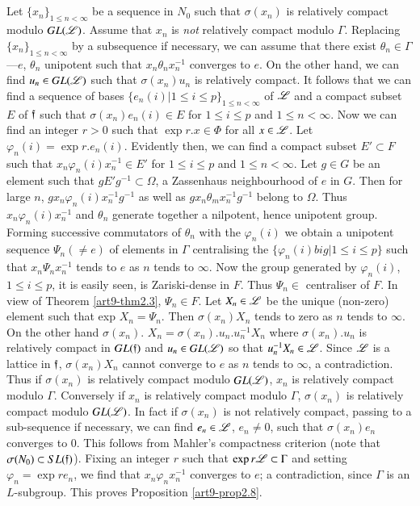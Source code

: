 \subsection{}\label{art9-subsec2.9}
Let $\{x_n\}_{1 \leqslant n < \infty}$ be a sequence in $N_0$ such that $\sigma (x_n)$ is relatively compact modulo $GL(\mathscr{L})$. Assume that $x_n$ is \textit{not} relatively compact modulo $\Gamma$. Replacing  $\{x_n\}_{1\leq n < \infty}$ by a subsequence if necessary, we can assume that there exist $\theta_n \in \Gamma$---$e$, $\theta_n$  unipotent such that $x_n \theta_n x^{-1}_n$ converges to $e$. On the other hand, we can find $u_n \in GL(\mathscr{L})$ such that $\sigma (x_n) u_n$ is relatively compact. It follows that we can find a sequence of bases $\{e_n (i) \big| 1 \leqslant i \leqslant p\}_{1 \leqslant n < \infty}$ of $\mathscr{L}$ and a compact subset $E$ of $\mathfrak{f}$ such that $\sigma (x_n) e_n (i) \in E$ for $1 \leqslant i \leqslant p$ and $1 \leqslant n < \infty$. Now we can find an integer $r >0$ such that $\exp r. x \in \Phi$ for all $x \in \mathscr{L}$. Let $\varphi_n (i) = \exp r. e_n (i)$. Evidently then, we can find a compact subset $E'\subset F$ such that $x_n \varphi_n (i) x^{-1}_n \in E'$ for $1 \leqslant i \leqslant p$ and $1 \leqslant n < \infty$. Let $g \in G$ be an element such that $g E' g^{-1} \subset \Omega$, a Zassenhaus neighbourhood of $e$ in $G$. Then for large $n$, $gx_n \varphi_n (i) x^{-1}_n g^{-1}$  as well as $gx_n \theta_m x^{-1}_n g^{-1}$ belong to $\Omega$. Thus $x_n \varphi_n (i)x^{-1}_n$ and $\theta_n$ generate together a nilpotent, hence unipotent group. Forming successive commutators of $\theta_n$ with the $\varphi_n (i)$ we obtain a unipotent sequence $\Psi_n (\neq e)$ of elements in $\Gamma$ centralising the $\{\varphi_n (i) big| 1 \leqslant i \leqslant p\}$ such that $x_n \Psi_n x^{-1}_n$ tends to $e$ as $n$ tends to $\infty$. Now the group generated by $\varphi_n (i)$, $1 \leqslant i \leqslant p$, it is easily seen, is Zariski-dense in $F$. Thus $\Psi_n \in $ centraliser of $F$. In view of Theorem \ref{art9-thm2.3}, $\Psi_n \in F$. Let $X_n \in \mathscr{L}$ be the unique (non-zero) element such that exp $X_n = \Psi_n$. Then $\sigma (x_n) X_n$ tends to zero as $n$ tends to $\infty$. On the other hand $\sigma(x_n)$. $X_n = \sigma (x_n). u_n. u^{-1}_n X_n$ where $\sigma (x_n). u_n$ is relatively compact in $GL(\mathfrak{f})$ and $u_n \in G L (\mathscr{L})$ so that $u^{-1}_n X_n \in \mathscr{L}$. Since $\mathscr{L}$ is a lattice in $\mathfrak{f}$, $\sigma (x_n) X_n$ cannot converge to $e$ as $n$ tends to $\infty$, a contradiction. Thus if $\sigma (x_n)$ is relatively compact modulo $GL(\mathscr{L})$, $x_n$ is relatively compact modulo $\Gamma$. Conversely if $x_n$ is relatively compact modulo $\Gamma$, $\sigma (x_n)$ is relatively compact modulo $GL(\mathscr{L})$. In fact if $\sigma (x_n)$ is not relatively compact, passing to a sub-sequence if necessary, we can find $e_n \in \mathscr{L}$, $e_n \neq 0$, such that $\sigma (x_n) e_n$ converges to 0. This follows from Mahler's compactness criterion (note that $\sigma (N_0) \subset SL(\mathfrak{f})$). Fixing an integer $r$ such that $\exp r \mathscr{L} \subset \Gamma$ and setting $\varphi_n = \exp r e_n$, we find that $x_n \varphi_n x^{-1}_n$ converges to $e$; a contradiction, since $\Gamma$ is an $L$-subgroup. This proves Proposition \ref{art9-prop2.8}.
   
